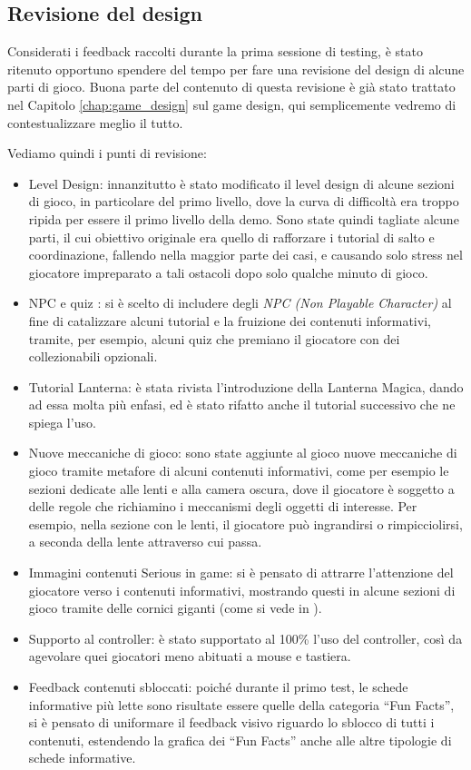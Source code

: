 \newpage


\subsection{Revisione del design}
\label{revisione}
Considerati i feedback raccolti durante la prima sessione di testing, è stato ritenuto opportuno spendere del tempo per fare una revisione del design di alcune parti di gioco.
Buona parte del contenuto di questa revisione è già stato trattato nel Capitolo \ref{chap:game_design} sul game design, qui semplicemente vedremo di contestualizzare meglio il tutto.

Vediamo quindi i punti di revisione:

\begin{itemize}

\item Level Design: innanzitutto è stato modificato il level design di alcune sezioni di gioco, in particolare del primo livello, dove la curva di difficoltà era troppo ripida per essere il primo livello della demo. Sono state quindi tagliate alcune parti, il cui obiettivo originale era quello di rafforzare i tutorial di salto e coordinazione, fallendo nella maggior parte dei casi, e causando solo stress nel giocatore impreparato a tali ostacoli dopo solo qualche minuto di gioco.
\item NPC e quiz : si è scelto di includere degli \textit{NPC (Non Playable Character)} al fine di catalizzare alcuni tutorial e la fruizione dei contenuti informativi, tramite, per esempio, alcuni quiz che premiano il giocatore con dei collezionabili opzionali.
\item Tutorial Lanterna: è stata rivista l'introduzione della Lanterna Magica, dando ad essa molta più enfasi, ed è stato rifatto anche il tutorial successivo che ne spiega l'uso.
\item Nuove meccaniche di gioco: sono state aggiunte al gioco nuove meccaniche di gioco tramite metafore di alcuni contenuti informativi, come per esempio le sezioni dedicate alle lenti e alla camera oscura, dove il giocatore è soggetto a delle regole che richiamino i meccanismi degli oggetti di interesse. Per esempio, nella sezione con le lenti, il giocatore può ingrandirsi o rimpicciolirsi, a seconda della lente attraverso cui passa.
\item Immagini contenuti Serious in game: si è pensato di attrarre l'attenzione del giocatore verso i contenuti informativi, mostrando questi in alcune sezioni di gioco tramite delle cornici giganti (come si vede in \myfig{\ref{fig:cornice_serious}}).
\item Supporto al controller: è stato supportato al 100\% l'uso del controller, così da agevolare quei giocatori meno abituati a mouse e tastiera.
\item Feedback contenuti sbloccati: poiché durante il primo test, le schede informative più lette sono risultate essere quelle della categoria ``Fun Facts'', si è pensato di uniformare il feedback visivo riguardo lo sblocco di tutti i contenuti, estendendo la grafica dei ``Fun Facts'' anche alle altre tipologie di schede informative.


\end{itemize}
